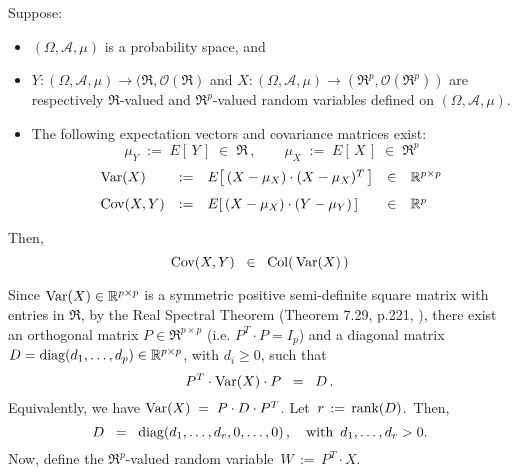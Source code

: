 
\begin{lemma}
\mbox{}\vskip 0.1cm
\noindent
Suppose:
\begin{itemize}
\item
	$(\Omega,\mathcal{A},\mu)$ is a probability space, and
\item
	$Y : (\Omega,\mathcal{A},\mu) \longrightarrow (\Re,\mathcal{O}(\Re)$
	and
	$X : (\Omega,\mathcal{A},\mu) \longrightarrow (\Re^{p},\mathcal{O}(\Re^{p}))$
	are respectively $\Re$-valued and $\Re^{p}$-valued random variables
	defined on $(\Omega,\mathcal{A},\mu)$.
\item
	The following expectation vectors and covariance matrices exist:
	\begin{equation*}
	\mu_{Y} \;:=\; E\!\left[\,Y\,\right] \;\in\; \Re\,,
	\quad\quad
	\mu_{X} \;:=\; E\!\left[\,X\,\right] \;\in\; \Re^{p}
	\end{equation*}
	\begin{equation*}
	\begin{array}{lclcl}
	\Var\!\left(X\right)
		&:=& E\!\left[\,(X-\mu_{X}) \cdot (X-\mu_{X})^{T}\,\right]
		&\in& \Re^{p \times p}
	\\
	\overset{{\color{white}\vert}}{\Cov}\!\left(X,Y\right)
		&:=& E\!\left[\,(X-\mu_{X}) \cdot (Y-\mu_{Y})\,\right]
		&\in& \Re^{p}
	\end{array}
	\end{equation*}
\end{itemize}
Then,
\begin{equation*}
\textnormal{Cov}(X,Y) \;\; \in \;\; \textnormal{Col}\!\left(\,\textnormal{Var}(X)\,\right)
\end{equation*}
\end{lemma}
\proof
Since $\textnormal{Var}(X) \in \mathbb{R}^{p \times p}$ is a symmetric positive semi-definite
square matrix with entries in $\Re$, by the Real Spectral Theorem
(Theorem 7.29, p.221, \cite{Axler2015}), there exist an
orthogonal matrix $P \in \Re^{p \times p}$ (i.e. $P^{T} \cdot P = I_{p}$) and
a diagonal matrix $D = \textnormal{diag}(d_{1},\ldots,d_{p})\in \mathbb{R}^{p \times p}$,
with $d_{i} \geq 0$, such that
\begin{equation*}
P^{T} \cdot \textnormal{Var}(X) \cdot P \;\;=\;\; D \,.
\end{equation*}
Equivalently, we have $\textnormal{Var}(X) \;=\; P \cdot D \cdot P^{T}$.
Let \,$r \,:=\, \textnormal{rank}(D)$.\, Then,
\begin{equation*}
D \;\; = \;\; \textnormal{diag}(d_{1},\ldots,d_{r},0,\ldots,0)\,,
\quad
\textnormal{with \,$d_{1}, \ldots, d_{r} > 0$}.
\end{equation*}
Now, define the $\Re^{p}$-valued random variable \,$W \,:=\, P^{T} \cdot X$.

